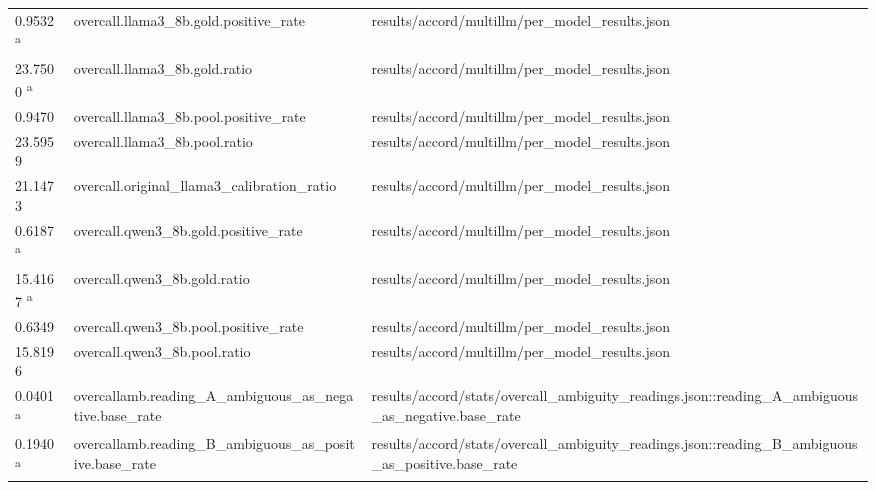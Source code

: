 \begin{longtable}{@{}p{0.7in}p{1.9in}p{2.6in}@{}}
0.9532 \textsuperscript{a} & overcall.\allowbreak{}llama3\_8b.\allowbreak{}gold.\allowbreak{}positive\_rate & results/\allowbreak{}accord/\allowbreak{}multillm/\allowbreak{}per\_model\_results.\allowbreak{}json\\
23.7500 \textsuperscript{a} & overcall.\allowbreak{}llama3\_8b.\allowbreak{}gold.\allowbreak{}ratio & results/\allowbreak{}accord/\allowbreak{}multillm/\allowbreak{}per\_model\_results.\allowbreak{}json\\
0.9470 & overcall.\allowbreak{}llama3\_8b.\allowbreak{}pool.\allowbreak{}positive\_rate & results/\allowbreak{}accord/\allowbreak{}multillm/\allowbreak{}per\_model\_results.\allowbreak{}json\\
23.5959 & overcall.\allowbreak{}llama3\_8b.\allowbreak{}pool.\allowbreak{}ratio & results/\allowbreak{}accord/\allowbreak{}multillm/\allowbreak{}per\_model\_results.\allowbreak{}json\\
21.1473 & overcall.\allowbreak{}original\_llama3\_calibration\_ratio & results/\allowbreak{}accord/\allowbreak{}multillm/\allowbreak{}per\_model\_results.\allowbreak{}json\\
0.6187 \textsuperscript{a} & overcall.\allowbreak{}qwen3\_8b.\allowbreak{}gold.\allowbreak{}positive\_rate & results/\allowbreak{}accord/\allowbreak{}multillm/\allowbreak{}per\_model\_results.\allowbreak{}json\\
15.4167 \textsuperscript{a} & overcall.\allowbreak{}qwen3\_8b.\allowbreak{}gold.\allowbreak{}ratio & results/\allowbreak{}accord/\allowbreak{}multillm/\allowbreak{}per\_model\_results.\allowbreak{}json\\
0.6349 & overcall.\allowbreak{}qwen3\_8b.\allowbreak{}pool.\allowbreak{}positive\_rate & results/\allowbreak{}accord/\allowbreak{}multillm/\allowbreak{}per\_model\_results.\allowbreak{}json\\
15.8196 & overcall.\allowbreak{}qwen3\_8b.\allowbreak{}pool.\allowbreak{}ratio & results/\allowbreak{}accord/\allowbreak{}multillm/\allowbreak{}per\_model\_results.\allowbreak{}json\\
0.0401 \textsuperscript{a} & overcallamb.\allowbreak{}reading\_A\_ambiguous\_as\_negative.\allowbreak{}base\_rate & results/\allowbreak{}accord/\allowbreak{}stats/\allowbreak{}overcall\_ambiguity\_readings.\allowbreak{}json::reading\_A\_ambiguous\_as\_negative.\allowbreak{}base\_rate\\
0.1940 \textsuperscript{a} & overcallamb.\allowbreak{}reading\_B\_ambiguous\_as\_positive.\allowbreak{}base\_rate & results/\allowbreak{}accord/\allowbreak{}stats/\allowbreak{}overcall\_ambiguity\_readings.\allowbreak{}json::reading\_B\_ambiguous\_as\_positive.\allowbreak{}base\_rate\\

\end{longtable}
